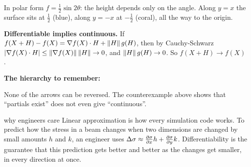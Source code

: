 \begin{center}

{\small\color{navy} In polar form $f=\tfrac12\sin 2\theta$: the height depends only on the
angle. Along $y=x$ the surface sits at $\tfrac12$ (blue), along $y=-x$ at $-\tfrac12$
(coral), all the way to the origin.}
\end{center}

\begin{extra}
\textbf{Differentiable implies continuous.} If $f(X+H)-f(X)=\nabla f(X)\cdot H+\left\lVert H\right\rVert g(H)$,
then by Cauchy-Schwarz $\left\lvert \nabla f(X)\cdot H\right\rvert\le\left\lVert \nabla f(X)\right\rVert\left\lVert H\right\rVert\to0$, and
$\left\lVert H\right\rVert g(H)\to0$. So $f(X+H)\to f(X)$.

\medskip
\textbf{The hierarchy to remember:}
\begin{center}
\end{center}
None of the arrows can be reversed. The counterexample above shows that ``partials exist''
does not even give ``continuous''.
\end{extra}

\begin{reallife}{why engineers care}
Linear approximation is how every simulation code works. To predict how the stress in a
beam changes when two dimensions are changed by small amounts $h$ and $k$, an engineer
uses $\Delta\sigma\approx\frac{\partial \sigma}{\partial x}h+\frac{\partial \sigma}{\partial y}k$. Differentiability is the guarantee that this
prediction gets better and better as the changes get smaller, in every direction at once.
\end{reallife}


